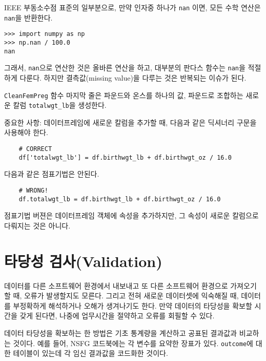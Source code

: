 
IEEE 부동소수점 표준의 일부분으로, 만약 인자중 하나가 {\tt nan} 이면,
모든 수학 연산은 {\tt nan}을 반환한다.

\begin{verbatim}
>>> import numpy as np
>>> np.nan / 100.0
nan
\end{verbatim}

그래서, {\tt nan}으로 연산한 것은 올바른 연산을 하고, 대부분의 판다스 함수는
{\tt nan}을 적절하게 다룬다. 하지만 결측값(missing value)을 다루는 것은 반복되는 이슈가 된다.


{\tt CleanFemPreg} 함수 마지막 줄은 파운드와 온스를 하나의 값, 
파운드로 조합하는 새로운 칼럼 \verb"totalwgt_lb"을 생성한다.

중요한 사항: 데이터프레임에 새로운 칼럼을 추가할 때, 다음과 같은 딕셔너리 구문을 사용해야 한다.


\begin{verbatim}
    # CORRECT
    df['totalwgt_lb'] = df.birthwgt_lb + df.birthwgt_oz / 16.0 
\end{verbatim}

다음과 같은 점표기법은 안된다.

\begin{verbatim}
    # WRONG!
    df.totalwgt_lb = df.birthwgt_lb + df.birthwgt_oz / 16.0 
\end{verbatim}

점표기법 버젼은 데이터프레임 객체에 속성을 추가하지만, 
그 속성이 새로운 칼럼으로 다뤄지는 것은 아니다.

\section{타당성 검사(Validation)}

데이터를 다른 소프트웨어 환경에서 내보내고 또 다른 소프트웨어 환경으로 가져오기 할 때, 오류가 발생할지도 모른다. 그리고 전혀 새로운 데이터셋에 익숙해질 때, 데이터를 부정확하게 해석하거나 오해가 생겨나기도 한다. 만약 데이터의 타당성을 확보할 시간을 갖게 된다면, 나중에 업무시간을 절약하고 오류를 회필할 수 있다.

데이터 타당성을 확보하는 한 방법은 기초 통계량을 계산하고 공표된 결과값과 비교하는 것이다. 예를 들어, NSFG 코드북에는 각 변수를 요약한 장표가 있다. {\tt outcome}에 대한 테이블이 있는데 각 임신 결과값을 코드화한 것이다.

